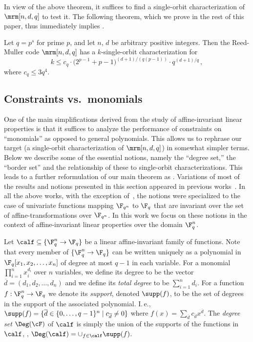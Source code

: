 In view of the above theorem, it suffices to find a single-orbit
characterization of $\mrm[n,d,q]$ to test it. The following theorem,
which we prove in the rest of this paper, thus immediately implies
.

\begin{theorem}\label{thm:main}
Let $q = p^s$ for prime $p$, and let $n$, $d$ be arbitrary positive
integers.
Then the Reed-Muller code $\mrm[n,d,q]$ has a $k$-single-orbit characterization for
 \[k \leq c_q \cdot  \big(2^{p-1}+p-1\big)^{(d+1)/(q(p-1))} \cdot q^{(d+1)/q}\,,\]
where $c_q \leq 3q^4$.
\end{theorem}

\subsection{Constraints vs.\ monomials}

One of the main simplifications derived from the study
of affine-invariant linear properties is that it suffices to
analyze the performance of constraints on ``monomials''
as opposed to general polynomials.
This allows us to rephrase our target (a single-orbit
characterization of $\mrm[n,d,q]$) in somewhat simpler
terms. Below we describe some of the essential notions,
namely the ``degree set,'' the ``border set'' and the
relationship of these to single-orbit characterizations.
This leads to a further reformulation of our main theorem
as .
Variations of most of the results and notions presented in this
section appeared in previous works~\cite{KS08,GKS09,BS11,BGMSS11}.
In all the above works, with the exception of~\cite{KS08},
the notions were specialized to the case of univariate functions
mapping $\F_{q^n}$ to $\F_q$
that are invariant over the set of affine-transformations over $\F_{q^n}$.
In this work we focus on these notions in the context of
affine-invariant linear properties over the domain $\F_q^n$.

Let $\calf \subseteq \{\F_{q}^n \to \F_q\}$ be a linear affine-invariant family of
functions. Note that every member of $\{\F_{q}^n \to \F_q\}$ can be written uniquely as
a polynomial in $\F_q[x_1,x_2,\ldots,x_n]$ of degree at most $q-1$ in each variable.
For a monomial  $\prod_{i=1}^nx_i^{d_i}$ over $n$ variables,  we define its degree to be the vector $\overline d = (d_1,d_2, \ldots, d_n)$ and we define its \emph{total degree} to be $\sum_{i=1}^n d_i$.
For a function
$f:\F_{q}^n \to \F_q$ we denote its \emph{support}, denoted $\supp(f)$, to
be the set of degrees in the support of the associated polynomial. I.\,e.,
$\supp(f) = \{ \overline d \in \{0,\ldots,q-1\}^n\;|\;c_{\overline d} \ne 0\}$ where $f(x) = \sum_{\overline d} c_{\overline d} x^{\overline d}$.
The \emph{degree set} $\Deg(\cF)$ of $\calf$ is simply the union of the supports of the functions
in $\calf$, \ie, $\Deg(\calf) = \cup_{f \in \calf} \supp(f)$.

